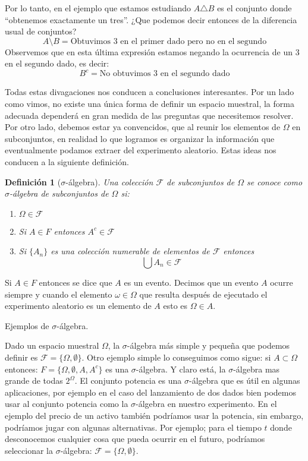 \documentclass[14pt]{extreport}
\theoremstyle{definicion}
\newtheorem{definition}{Definición}[chapter]
\theoremstyle{propiedad}
\begin{document}
Por lo tanto, en el ejemplo que estamos estudiando $A \triangle B$ es el conjunto donde ``obtenemos exactamente un tres''. ¿Que podemos decir entonces de la diferencia
usual de conjuntos?
$$
  A \setminus B = \text{Obtuvimos 3 en el primer dado pero no en el segundo}
$$
Observemos que en esta última expresión estamos negando la ocurrencia de un 3 en el segundo dado, es decir:
$$
  B^c = \text{No obtuvimos 3 en el segundo dado}
$$

Todas estas divagaciones nos conducen a conclusiones interesantes. Por un lado como vimos, no existe una única forma de definir un espacio muestral, la forma adecuada dependerá en gran medida de las preguntas que necesitemos resolver. Por otro lado, debemos estar ya convencidos, que al reunir los elementos de $\Omega$ en subconjuntos, en realidad lo que logramos es organizar la información que eventualmente podamos extraer del experimento aleatorio. Estas ideas nos conducen a la siguiente definición.
\begin{definition}[$\sigma$-álgebra]
  Una colección $\mathcal{F}$ de subconjuntos de $\Omega$ se conoce como $\sigma$-álgebra de subconjuntos de $\Omega$ si:
  \begin{enumerate}
    \item $\Omega \in \mathcal{F}$
    \item Si $A \in F$ entonces $A^c \in \mathcal{F}$
    \item Si $\{A_n\}$ es una colección numerable de elementos de $\mathcal{F}$ entonces 
    $$
    \bigcup A_n \in \mathcal{F}
    $$
  \end{enumerate}
\end{definition}

Si $A \in F$ entonces se dice que $A$ es un evento. Decimos que un evento $A$ ocurre siempre y cuando el elemento $\omega \in \Omega$ que resulta después de ejecutado el experimento aleatorio es un elemento de $A$ esto es $\Omega \in A$.

Ejemplos de $\sigma$-álgebra.

Dado un espacio muestral $\Omega$, la $\sigma$-álgebra más simple y pequeña que podemos definir es $\mathcal{F}=\{\Omega, \emptyset\}$. Otro ejemplo simple lo conseguimos como sigue: si $A \subset \Omega$ entonces: $F = \{\Omega,\emptyset, A, A^c\}$ es una $\sigma$-álgebra. Y claro está, la $\sigma$-álgebra mas grande de todas $2^\Omega$. El conjunto potencia es una $\sigma$-álgebra que es útil en algunas aplicaciones, por ejemplo en el caso del lanzamiento de dos dados bien podemos usar al conjunto potencia como la $\sigma$-álgebra en nuestro experimento. En el ejemplo del precio de un activo también podríamos usar la potencia, sin embargo, podríamos jugar con algunas alternativas. Por ejemplo; para el tiempo $t$ donde desconocemos cualquier cosa que pueda ocurrir en el futuro, podríamos seleccionar la $\sigma$-álgebra: $\mathcal{F} = \{\Omega,\emptyset\}$.
\end{document}

